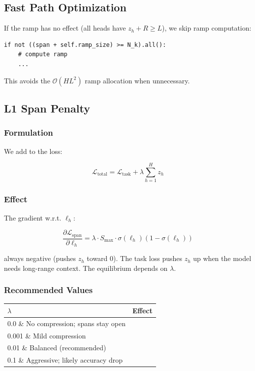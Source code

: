 \subsection{Fast Path Optimization}

If the ramp has no effect (all heads have $z_h + R \geq L$), we skip ramp 
computation:

\begin{lstlisting}
if not ((span + self.ramp_size) >= N_k).all():
    # compute ramp
    ...
\end{lstlisting}

This avoids the $\mathcal{O}(H L^2)$ ramp allocation when unnecessary.

\subsection{L1 Span Penalty}

\subsubsection{Formulation}

We add to the loss:

\[
\mathcal{L}_\text{total} = \mathcal{L}_\text{task} + \lambda \sum_{h=1}^H z_h
\]

\subsubsection{Effect}

The gradient w.r.t. $\ell_h$:

\[
\frac{\partial \mathcal{L}_\text{span}}{\partial \ell_h} = \lambda \cdot S_\text{max} \cdot \sigma(\ell_h)(1 - \sigma(\ell_h))
\]

always negative (pushes $z_h$ toward 0). The task loss pushes $z_h$ up 
when the model needs long-range context. The equilibrium depends on 
$\lambda$.

\subsubsection{Recommended Values}

\begin{table}[H]
\centering
\small
\begin{tabular}{ll}
\toprule
\textbf{$\lambda$} & \textbf{Effect} \\
\midrule
0.0 \& No compression; spans stay open \\
0.001 \& Mild compression \\
0.01 \& Balanced (recommended) \\
0.1 \& Aggressive; likely accuracy drop \\
\bottomrule
\end{tabular}
\end{table}

